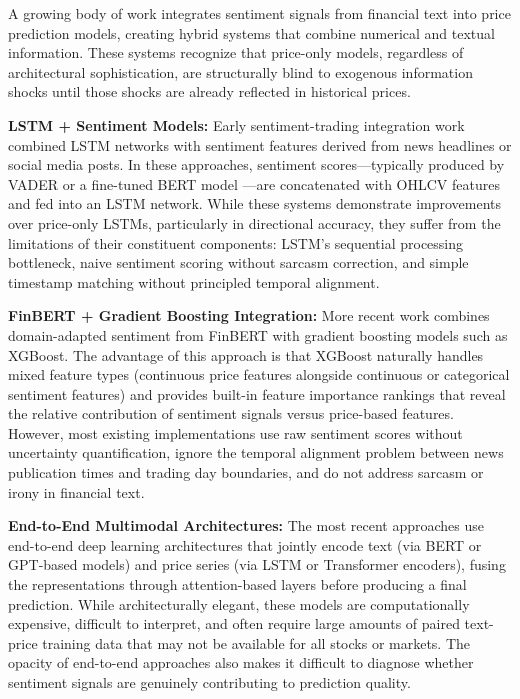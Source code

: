 A growing body of work integrates sentiment signals from financial text into price prediction models, creating hybrid systems that combine numerical and textual information. These systems recognize that price-only models, regardless of architectural sophistication, are structurally blind to exogenous information shocks until those shocks are already reflected in historical prices.

\textbf{LSTM + Sentiment Models:}
Early sentiment-trading integration work combined LSTM networks with sentiment features derived from news headlines or social media posts. In these approaches, sentiment scores---typically produced by VADER \cite{vader2014} or a fine-tuned BERT model \cite{devlin2019}---are concatenated with OHLCV features and fed into an LSTM network. While these systems demonstrate improvements over price-only LSTMs, particularly in directional accuracy, they suffer from the limitations of their constituent components: LSTM's sequential processing bottleneck, naive sentiment scoring without sarcasm correction, and simple timestamp matching without principled temporal alignment.

\textbf{FinBERT + Gradient Boosting Integration:}
More recent work combines domain-adapted sentiment from FinBERT \cite{araci2019} with gradient boosting models such as XGBoost. The advantage of this approach is that XGBoost naturally handles mixed feature types (continuous price features alongside continuous or categorical sentiment features) and provides built-in feature importance rankings that reveal the relative contribution of sentiment signals versus price-based features. However, most existing implementations use raw sentiment scores without uncertainty quantification, ignore the temporal alignment problem between news publication times and trading day boundaries, and do not address sarcasm or irony in financial text.

\textbf{End-to-End Multimodal Architectures:}
The most recent approaches use end-to-end deep learning architectures that jointly encode text (via BERT or GPT-based models) and price series (via LSTM or Transformer encoders), fusing the representations through attention-based layers before producing a final prediction. While architecturally elegant, these models are computationally expensive, difficult to interpret, and often require large amounts of paired text-price training data that may not be available for all stocks or markets. The opacity of end-to-end approaches also makes it difficult to diagnose whether sentiment signals are genuinely contributing to prediction quality.

